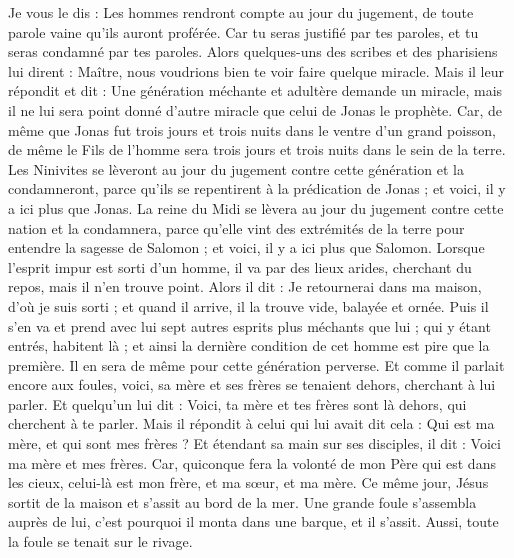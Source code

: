 \begin{multicols}{2}
Je vous le dis : Les hommes rendront compte au jour du jugement, de toute parole vaine qu'ils auront proférée.
Car tu seras justifié par tes paroles, et tu seras condamné par tes paroles.
Alors quelques-uns des scribes et des pharisiens lui dirent : Maître, nous voudrions bien te voir faire quelque miracle.
Mais il leur répondit et dit : Une génération méchante et adultère demande un miracle, mais il ne lui sera point donné d'autre miracle que celui de Jonas le prophète.
Car, de même que Jonas fut trois jours et trois nuits dans le ventre d'un grand poisson, de même le Fils de l'homme sera trois jours et trois nuits dans le sein de la terre.
Les Ninivites se lèveront au jour du jugement contre cette génération et la condamneront, parce qu'ils se repentirent à la prédication de Jonas ; et voici, il y a ici plus que Jonas.
La reine du Midi se lèvera au jour du jugement contre cette nation et la condamnera, parce qu'elle vint des extrémités de la terre pour entendre la sagesse de Salomon ; et voici, il y a ici plus que Salomon.
Lorsque l'esprit impur est sorti d'un homme, il va par des lieux arides, cherchant du repos, mais il n'en trouve point.
Alors il dit : Je retournerai dans ma maison, d'où je suis sorti ; et quand il arrive, il la trouve vide, balayée et ornée.
Puis il s'en va et prend avec lui sept autres esprits plus méchants que lui ; qui y étant entrés, habitent là ; et ainsi la dernière condition de cet homme est pire que la première. Il en sera de même pour cette génération perverse.
Et comme il parlait encore aux foules, voici, sa mère et ses frères se tenaient dehors, cherchant à lui parler.
Et quelqu'un lui dit : Voici, ta mère et tes frères sont là dehors, qui cherchent à te parler.
Mais il répondit à celui qui lui avait dit cela : Qui est ma mère, et qui sont mes frères ?
Et étendant sa main sur ses disciples, il dit : Voici ma mère et mes frères.
Car, quiconque fera la volonté de mon Père qui est dans les cieux, celui-là est mon frère, et ma sœur, et ma mère.
\VerseOne{}Ce même jour, Jésus sortit de la maison et s'assit au bord de la mer.
Une grande foule s'assembla auprès de lui, c’est pourquoi il monta dans une barque, et il s'assit. Aussi, toute la foule se tenait sur le rivage.

\end{multicols}
